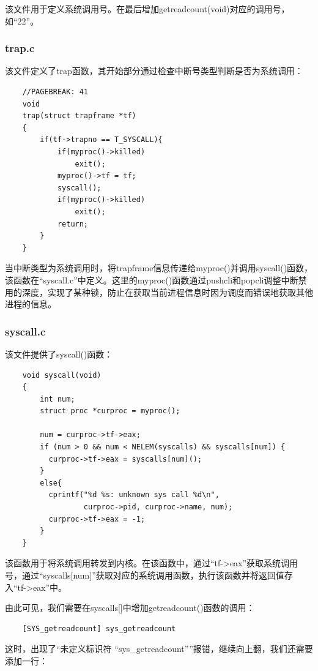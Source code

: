 \documentclass[fontset=ubuntu]{ctexart}
\begin{document}
该文件用于定义系统调用号。在最后增加getreadcount(void)对应的调用号，如“22”。 %

\subsubsection{trap.c}

该文件定义了trap函数，其开始部分通过检查中断号类型判断是否为系统调用：

\begin{lstlisting}
    //PAGEBREAK: 41
    void
    trap(struct trapframe *tf)
    {
        if(tf->trapno == T_SYSCALL){
            if(myproc()->killed)
                exit();
            myproc()->tf = tf;
            syscall();
            if(myproc()->killed)
                exit();
            return;
        }
    }
\end{lstlisting}

当中断类型为系统调用时，将trapframe信息传递给myproc()并调用syscall()函数，该函数在“syscall.c”中定义。这里的myproc()函数通过pushcli和popcli调整中断禁用的深度，实现了某种锁，防止在获取当前进程信息时因为调度而错误地获取其他进程的信息。 %

\subsubsection{syscall.c}

该文件提供了syscall()函数：%
\begin{lstlisting}
    void syscall(void)
    {
        int num;
        struct proc *curproc = myproc();
      
        num = curproc->tf->eax;
        if (num > 0 && num < NELEM(syscalls) && syscalls[num]) {
          curproc->tf->eax = syscalls[num]();
        }
        else{
          cprintf("%d %s: unknown sys call %d\n",
                  curproc->pid, curproc->name, num);
          curproc->tf->eax = -1;
        }
    }
\end{lstlisting}

该函数用于将系统调用转发到内核。在该函数中，通过“tf-\textgreater{}eax”获取系统调用号，通过“syscalls[num]”获取对应的系统调用函数，执行该函数并将返回值存入“tf-\textgreater{}eax”中。

由此可见，我们需要在syscalls[]中增加getreadcount()函数的调用： %
\begin{lstlisting}
    [SYS_getreadcount] sys_getreadcount
\end{lstlisting}

这时，出现了“未定义标识符 ``sys\_getreadcount''”报错，继续向上翻，我们还需要添加一行：
\end{document}
